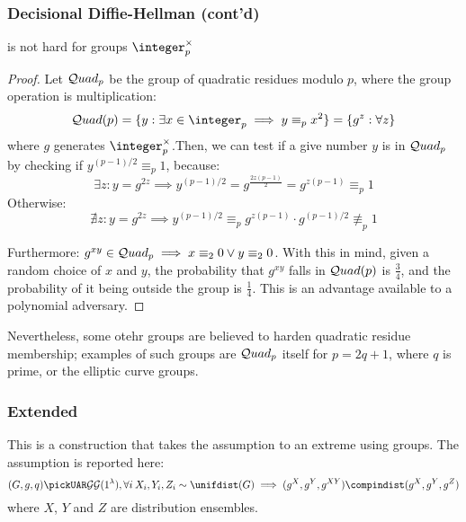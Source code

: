 
\subsubsection{Decisional Diffie-Hellman (cont'd)}

\begin{claim}
    \ddh{} is not hard for groups $\integer_p^\times$
\end{claim}

\begin{proof}
    Let $\mathcal{Q}uad_p$ be the group of quadratic residues modulo $p$, where the group operation is multiplication:
    \[
        \quadres(p) = \{y : \exists x \in \integer_p \implies y \equiv_p x^2\} = \{g^z : \forall z\}
    \]
    where $g$ generates $\integer_p^\times$.Then, we can test if a give number $y$ is in $\mathcal{Q}uad_p$ by checking if $y^{(p-1)/2} \equiv_p 1$, because:
    \[
        \exists z : y = g^{2z} \implies y^{(p-1)/2} = g^{\frac{2z(p-1)}{2}} = g^{z(p-1)} \equiv_p 1
    \]
    Otherwise: %
    \[
        \nexists z : y = g^{2z} \implies y^{(p-1)/2} \equiv_p g^{z(p-1)} \cdot g^{(p-1)/2} \not\equiv_p 1
    \]

    Furthermore: $g^{xy} \in \mathcal{Q}uad_p \implies x \equiv_2 0 \vee y \equiv_2 0$. With this in mind, given a random choice of $x$ and $y$, the probability that $g^{xy}$ falls in $\mathcal{Q}uad(p)$ is $\frac{3}{4}$, and the probability of it being outside the group is $\frac{1}{4}$. This is an advantage available to a polynomial adversary.
\end{proof}

Nevertheless, some otehr groups are believed to harden quadratic residue membership; examples of such groups are $\mathcal{Q}uad_p$ itself for $p = 2q + 1$, where $q$ is prime, or the elliptic curve groups.

\subsubsection{Extended \ddh}

This is a construction that takes the \ddh{} assumption to an extreme using groups. The \ddh{} assumption is reported here:
\[
    (G, g, q) \pickUAR \groupgen(1^\lambda), \forall i\: X_i, Y_i, Z_i \sim \unifdist(G) \implies (g^X, g^Y, g^{XY}) \compindist (g^X, g^Y, g^Z)
\]
where $X$, $Y$ and $Z$ are distribution ensembles.

